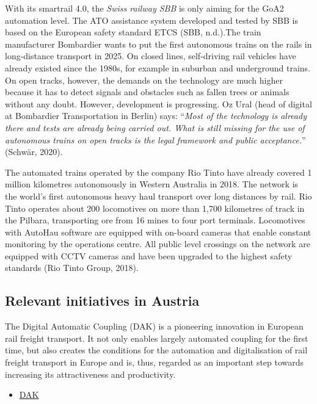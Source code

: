 \documentclass[
]{book}
\providecommand{\tightlist}{%
  \setlength{\itemsep}{0pt}\setlength{\parskip}{0pt}}
\begin{document}
With its smartrail 4.0, the \emph{Swiss railway SBB} is only aiming for the GoA2 automation level. The ATO assistance system developed and tested by SBB is based on the European safety standard ETCS (SBB, n.d.).The train manufacturer Bombardier wants to put the first autonomous trains on the rails in long-distance transport in 2025. On closed lines, self-driving rail vehicles have already existed since the 1980s, for example in suburban and underground trains. On open tracks, however, the demands on the technology are much higher because it has to detect signals and obstacles such as fallen trees or animals without any doubt. However, development is progressing. Oz Ural (head of digital at Bombardier Transportation in Berlin) says: ``\emph{Most of the technology is already there and tests are already being carried out. What is still missing for the use of autonomous trains on open tracks is the legal framework and public acceptance.}'' (Schwär, 2020).

The automated trains operated by the company Rio Tinto have already covered 1 million kilometres autonomously in Western Australia in 2018. The network is the world's first autonomous heavy haul transport over long distances by rail. Rio Tinto operates about 200 locomotives on more than 1,700 kilometres of track in the Pilbara, transporting ore from 16 mines to four port terminals. Locomotives with AutoHau software are equipped with on-board cameras that enable constant monitoring by the operations centre. All public level crossings on the network are equipped with CCTV cameras and have been upgraded to the highest safety standards (Rio Tinto Group, 2018).

\hypertarget{relevant-initiatives-in-austria-40}{%
\subsection*{Relevant initiatives in Austria}\label{relevant-initiatives-in-austria-40}}

The Digital Automatic Coupling (DAK) is a pioneering innovation in European rail freight transport. It not only enables largely automated coupling for the first time, but also creates the conditions for the automation and digitalisation of rail freight transport in Europe and is, thus, regarded as an important step towards increasing its attractiveness and productivity.

\begin{itemize}
\tightlist
\item
  \href{https://presse.oebb.at/de/presseinformationen/20200908-oebb-fokus-auf-digitaler-automatischer-kupplung-im-gueterverkehr}{DAK}
\end{itemize}
\end{document}
